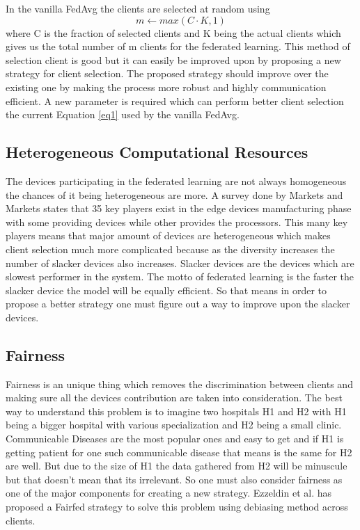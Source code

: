 \documentclass[conference]{IEEEtran}
\begin{document}
In the vanilla FedAvg the clients are selected at random using 
\begin{equation}
 m \gets max(C\cdot K,1)
 \label{eq1}
 \end{equation}
 where C is the fraction of selected clients and K being the actual clients which gives us the total number of m clients for the federated learning. This method of selection client is good but it can easily be improved upon by proposing a new strategy for client selection. The proposed strategy should improve over the existing one by making the process more robust and highly communication efficient. A new parameter is required which can perform better client selection the current Equation \ref{eq1} used by the vanilla FedAvg.   

\subsection{Heterogeneous Computational Resources}
The devices participating in the federated learning are not always homogeneous the chances of it being heterogeneous are more. A survey done by Markets and Markets \cite{market} states that 35 key players exist in the edge devices manufacturing phase with some providing devices while other provides the processors. This many key players means that major amount of devices are heterogeneous which makes client selection much more complicated because as the diversity increases the number of slacker devices also increases. Slacker devices are the devices which are slowest performer in the system. The motto of federated learning is the faster the slacker device the model will be equally efficient. So that means in order to propose a better strategy one must figure out a way to improve upon the slacker devices. 

\subsection{Fairness}
Fairness is an unique thing which removes the discrimination between clients and making sure all the devices contribution are taken into consideration. The best way to understand this problem is to imagine two hospitals H1 and H2 with H1 being a bigger hospital with various specialization and H2 being a small clinic. Communicable Diseases are the most popular ones and easy to get and if H1 is getting patient for one such communicable disease that means is the same for H2 are well. But due to the size of H1 the data gathered from H2 will be minuscule but that doesn't mean that its irrelevant. So one must also consider fairness as one of the major components for creating a new strategy. Ezzeldin et al. \cite{ezzeldin2023fairfed} has proposed a Fairfed strategy to solve this problem using debiasing method across clients.
 
\end{document}
